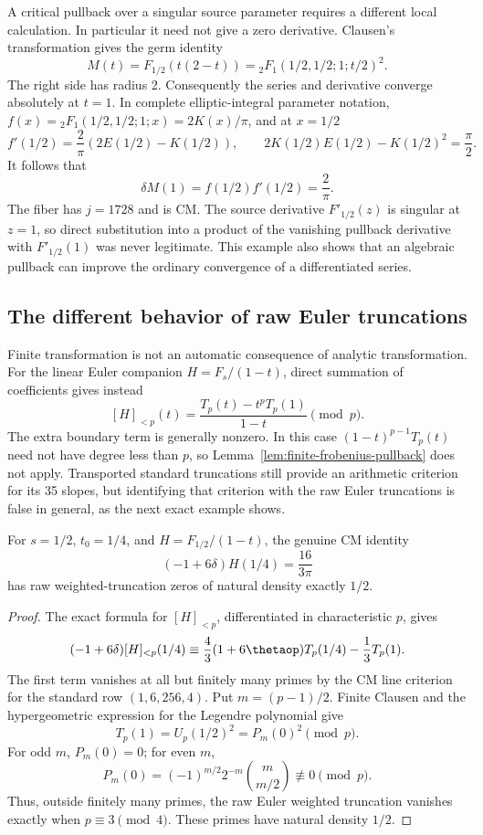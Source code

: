 A critical pullback over a singular source parameter requires a
different local calculation. In particular it need not give a zero
derivative. Clausen's transformation gives the germ identity
\[
 M(t)=F_{1/2}(t(2-t))
 ={}_2F_1(1/2,1/2;1;t/2)^2.
\]
The right side has radius 2. Consequently the series and derivative
converge absolutely at $t=1$. In complete elliptic-integral parameter
notation, $f(x)={}_2F_1(1/2,1/2;1;x)=2K(x)/\pi$, and at $x=1/2$
\[
 f'(1/2)=\frac2\pi(2E(1/2)-K(1/2)),\qquad
 2K(1/2)E(1/2)-K(1/2)^2=\frac\pi2.
\]
It follows that
\[
 \delta M(1)=f(1/2)f'(1/2)=\frac2\pi.
\]
The fiber has $j=1728$ and is CM. The source derivative $F'_{1/2}(z)$
is singular at $z=1$, so direct substitution into a product of the
vanishing pullback derivative with $F'_{1/2}(1)$ was never legitimate.
This example also shows that an algebraic pullback can improve the
ordinary convergence of a differentiated series.

\subsection{The different behavior of raw Euler truncations}
Finite transformation is not an automatic consequence of
analytic transformation.  For the linear Euler companion
$H=F_s/(1-t)$, direct summation of coefficients gives instead
\[
 [H]_{<p}(t)
  =\frac{T_p(t)-t^pT_p(1)}{1-t}\pmod p.
\]
The extra boundary term is generally nonzero.  In this case
$(1-t)^{p-1}T_p(t)$ need not have degree less than $p$, so
Lemma~\ref{lem:finite-frobenius-pullback} does not apply.  Transported
standard truncations still provide an arithmetic criterion for its
35 slopes, but identifying that criterion with the raw Euler
truncations is false in general, as the next exact example shows.

\begin{proposition}
\label{prop:euler-raw-density-obstruction}
For $s=1/2$, $t_0=1/4$, and $H=F_{1/2}/(1-t)$, the genuine CM
identity
\[
 (-1+6\delta)H(1/4)=\frac{16}{3\pi}
\]
has raw weighted-truncation zeros of natural density exactly $1/2$.
\end{proposition}
\begin{proof}
The exact formula for $[H]_{<p}$, differentiated in characteristic
$p$, gives
\[
 (-1+6\delta)[H]_{<p}(1/4)
 \equiv\frac43(1+6\thetaop)T_p(1/4)-\frac13T_p(1).
\]
The first term vanishes at all but finitely many primes by the CM
line criterion for the standard row $(1,6,256,4)$.
Put $m=(p-1)/2$.  Finite Clausen and the hypergeometric expression
for the Legendre polynomial give
\[
 T_p(1)=U_p(1/2)^2=P_m(0)^2\pmod p.
\]
For odd $m$, $P_m(0)=0$; for even $m$,
\[
 P_m(0)=(-1)^{m/2}2^{-m}\binom{m}{m/2}\not\equiv0\pmod p.
\]
Thus, outside finitely many primes, the raw Euler weighted
truncation vanishes exactly when $p\equiv3\pmod4$.  These primes
have natural density $1/2$.
\end{proof}



